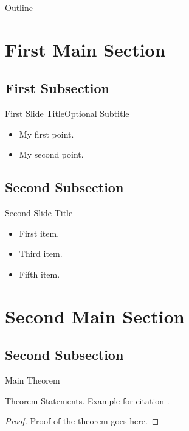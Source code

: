 
\begin{frame}{Outline}
  \tableofcontents
\end{frame}

\section{First Main Section}

\subsection{First Subsection}
\begin{frame}{First Slide Title}{Optional Subtitle}
  \begin{itemize}
  \item {
    My first point.
  }
  \item {
    My second point.
  }
  \end{itemize}
\end{frame}

\subsection{Second Subsection}
\begin{frame}{Second Slide Title}
  \begin{itemize}
  \item {
    First item.
    \pause %
  }
  \item<3-> {
    Third item.
  }
  \item<5-> {
    Fifth item. 
  }
  \end{itemize}
\end{frame}

\section{Second Main Section}

\subsection{Second Subsection}
\begin{frame}{Main Theorem}
\begin{theorem}
Theorem Statements. Example for citation \cite{Author1990}.
\end{theorem}

\begin{proof}
Proof of the theorem goes here.
\end{proof}
\end{frame}

